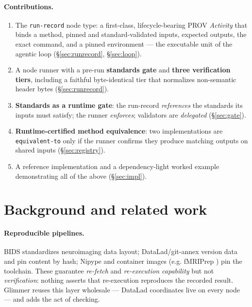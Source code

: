\documentclass[preprint]{glimmer-paper}
\newcommand{\code}[1]{\texttt{#1}}
\begin{document}
\paragraph{Contributions.}
\begin{enumerate}
\item The \code{run-record} node type: a first-class, lifecycle-bearing PROV \emph{Activity}
  that binds a method, pinned and standard-validated inputs, expected outputs, the exact
  command, and a pinned environment --- the executable unit of the agentic loop
  (\S\ref{sec:runrecord}, \S\ref{sec:loop}).
\item A node runner with a pre-run \textbf{standards gate} and \textbf{three verification
  tiers}, including a faithful byte-identical tier that normalizes non-semantic header bytes
  (\S\ref{sec:runrecord}).
\item \textbf{Standards as a runtime gate}: the run-record \emph{references} the standards
  its inputs must satisfy; the runner \emph{enforces}; validators are \emph{delegated}
  (\S\ref{sec:gate}).
\item \textbf{Runtime-certified method equivalence}: two implementations are
  \code{equivalent-to} only if the runner confirms they produce matching outputs on shared
  inputs (\S\ref{sec:registry}).
\item A reference implementation and a dependency-light worked example demonstrating all of
  the above (\S\ref{sec:impl}).
\end{enumerate}

\section{Background and related work}

\paragraph{Reproducible pipelines.} BIDS \citep{gorgolewski2016bids} standardizes
neuroimaging data layout; DataLad/git-annex \citep{halchenko2021datalad} version data and
pin content by hash; Nipype \citep{gorgolewski2011nipype} and container images (e.g.
fMRIPrep \citep{esteban2019fmriprep}) pin the toolchain. These guarantee \emph{re-fetch} and
\emph{re-execution capability} but not \emph{verification}: nothing asserts that
re-execution reproduces the recorded result. Glimmer reuses this layer wholesale --- DataLad
coordinates live on every node --- and adds the act of checking.
\end{document}
